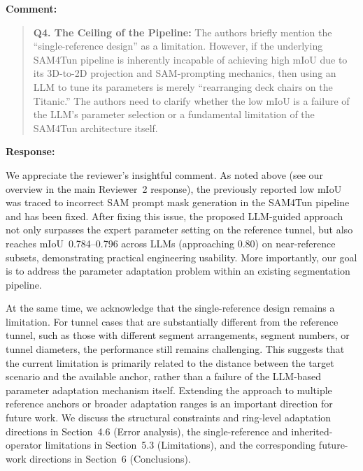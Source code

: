 \documentclass[11pt,a4paper]{article}
\newenvironment{commentblock}{%
  \par\smallskip\noindent\textbf{Comment:}\par
  \begin{quote}\itshape\color{black}
}{%
  \end{quote}\smallskip
}
\newenvironment{responseblock}{%
  \par\smallskip\noindent\textbf{Response:}\par
  \begingroup\color{responsegreen}
}{%
  \endgroup\smallskip
}
\begin{document}
\begin{commentblock}
\textbf{Q4. The Ceiling of the Pipeline:} The authors briefly mention the ``single-reference design'' as a limitation. However, if the underlying SAM4Tun pipeline is inherently incapable of achieving high mIoU due to its 3D-to-2D projection and SAM-prompting mechanics, then using an LLM to tune its parameters is merely ``rearranging deck chairs on the Titanic.'' The authors need to clarify whether the low mIoU is a failure of the LLM's parameter selection or a fundamental limitation of the SAM4Tun architecture itself.
\end{commentblock}
\begin{responseblock}
We appreciate the reviewer’s insightful comment. As noted above (see our overview in the main Reviewer~2 response), the previously reported low mIoU was traced to incorrect SAM prompt mask generation in the SAM4Tun pipeline and has been fixed. After fixing this issue, the proposed LLM-guided approach not only surpasses the expert parameter setting on the reference tunnel, but also reaches mIoU~0.784--0.796 across LLMs (approaching 0.80) on near-reference subsets, demonstrating practical engineering usability. More importantly, our goal is to address the parameter adaptation problem within an existing segmentation pipeline.

At the same time, we acknowledge that the single-reference design remains a limitation. For tunnel cases that are substantially different from the reference tunnel, such as those with different segment arrangements, segment numbers, or tunnel diameters, the performance still remains challenging. This suggests that the current limitation is primarily related to the distance between the target scenario and the available anchor, rather than a failure of the LLM-based parameter adaptation mechanism itself. Extending the approach to multiple reference anchors or broader adaptation ranges is an important direction for future work. We discuss the structural constraints and ring-level adaptation directions in Section~4.6 (Error analysis), the single-reference and inherited-operator limitations in Section~5.3 (Limitations), and the corresponding future-work directions in Section~6 (Conclusions).

\end{responseblock}
\end{document}

